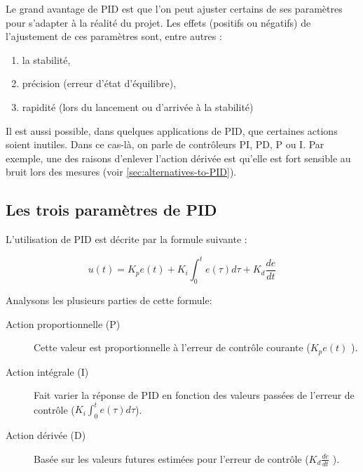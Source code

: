 Le grand avantage de PID est que l'on peut ajuster certains de ses paramètres pour s'adapter à la réalité du projet.
Les effets (positifs ou négatifs) de l'ajustement de ces paramètres sont, entre autres \cite{zhong2006pid} :
\begin{enumerate}
\item la stabilité,
\item précision (erreur d'état d'équilibre),
\item rapidité (lors du lancement ou d'arrivée à la stabilité)
\end{enumerate}

Il est aussi possible, dans quelques applications de PID, que certaines actions soient inutiles.
Dans ce cas-là, on parle de contrôleurs PI, PD, P ou I.
Par exemple, une des raisons d'enlever l'action dérivée est qu'elle est fort sensible au bruit lors des mesures
(voir \ref{sec:alternatives-to-PID}).

\newpage

\subsection{Les trois paramètres de PID}

L'utilisation de PID est décrite par la formule suivante\cite{visioli2006practical} :

$$u(t) = K_p e(t) + K_i \int_{0}^{t} e(\tau) d\tau + K_d \frac{de}{dt}$$

Analysons les plusieurs parties de cette formule:

\begin{description}
\item[Action proportionnelle (P)]
	Cette valeur est proportionnelle à l'erreur de contrôle courante ($K_p e(t)$ ).
\item[Action intégrale (I)]
	Fait varier la réponse de PID en fonction des valeurs passées de l'erreur de contrôle ($K_i \int_{0}^{t} e(\tau) d\tau$).
\item[Action dérivée (D)]
	Basée sur les valeurs futures estimées pour l'erreur de contrôle ($K_d \frac{de}{dt}$ ).
\end{description}
